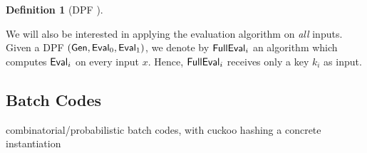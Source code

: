 \documentclass[sigconf]{acmart}
\newcommand{\Gen}{{\sf Gen}}
\newcommand{\Eval}{{\sf Eval}}
\newcommand{\FullEval}{{\sf FullEval}}
\newcommand{\Adv}{{\sf Adv}}
\newtheorem{definition}[theorem]{Definition}
\begin{document}
\begin{definition}[DPF \cite{EC:GilIsh14,CCS:BoyGilIsh16}]
\begin{itemize}
\end{itemize}
\end{definition}
 
 We will also be interested in applying the evaluation algorithm on \emph{all} inputs. Given a DPF $(\Gen,\Eval_0,\Eval_1)$, we denote by $\FullEval_i$ an algorithm which computes $\Eval_i$ on every input $x$. Hence, $\FullEval_i$ receives only a key $k_i$ as input.



\subsection{Batch Codes}
combinatorial/probabilistic batch codes, with cuckoo hashing a concrete instantiation
\end{document}

